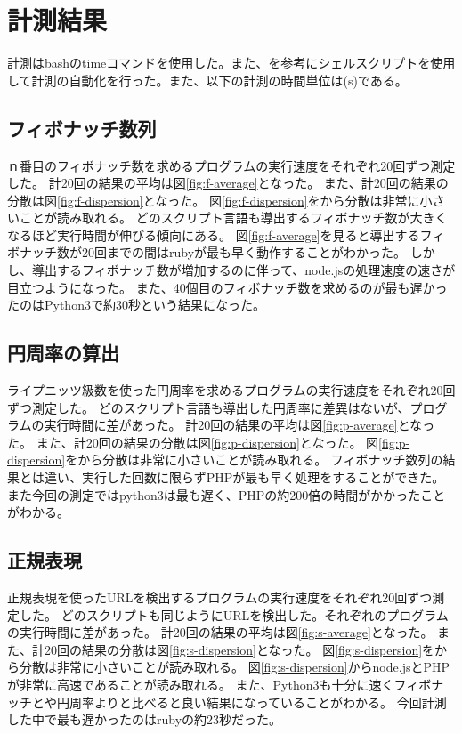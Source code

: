 \chapter{計測結果}
\label{cha:result}
計測はbashのtimeコマンドを使用した。また、\cite{bash}を参考にシェルスクリプトを使用して計測の自動化を行った。また、以下の計測の時間単位は(s)である。
\section{フィボナッチ数列}
ｎ番目のフィボナッチ数を求めるプログラムの実行速度をそれぞれ20回ずつ測定した。
計20回の結果の平均は図\ref{fig:f-average}となった。
また、計20回の結果の分散は図\ref{fig:f-dispersion}となった。
図\ref{fig:f-dispersion}をから分散は非常に小さいことが読み取れる。
どのスクリプト言語も導出するフィボナッチ数が大きくなるほど実行時間が伸びる傾向にある。
図\ref{fig:f-average}を見ると導出するフィボナッチ数が20回までの間はrubyが最も早く動作することがわかった。
しかし、導出するフィボナッチ数が増加するのに伴って、node.jsの処理速度の速さが目立つようになった。
また、40個目のフィボナッチ数を求めるのが最も遅かったのはPython3で約30秒という結果になった。

\section{円周率の算出}
ライプニッツ級数を使った円周率を求めるプログラムの実行速度をそれぞれ20回ずつ測定した。
どのスクリプト言語も導出した円周率に差異はないが、プログラムの実行時間に差があった。
計20回の結果の平均は図\ref{fig:p-average}となった。
また、計20回の結果の分散は図\ref{fig:p-dispersion}となった。
図\ref{fig:p-dispersion}をから分散は非常に小さいことが読み取れる。
フィボナッチ数列の結果とは違い、実行した回数に限らずPHPが最も早く処理をすることができた。
また今回の測定ではpython3は最も遅く、PHPの約200倍の時間がかかったことがわかる。

\section{正規表現}
正規表現を使ったURLを検出するプログラムの実行速度をそれぞれ20回ずつ測定した。
どのスクリプトも同じようにURLを検出した。それぞれのプログラムの実行時間に差があった。
計20回の結果の平均は図\ref{fig:s-average}となった。
また、計20回の結果の分散は図\ref{fig:s-dispersion}となった。
図\ref{fig:s-dispersion}をから分散は非常に小さいことが読み取れる。
図\ref{fig:s-dispersion}からnode.jsとPHPが非常に高速であることが読み取れる。
また、Python3も十分に速くフィボナッチとや円周率よりと比べると良い結果になっていることがわかる。
今回計測した中で最も遅かったのはrubyの約23秒だった。


